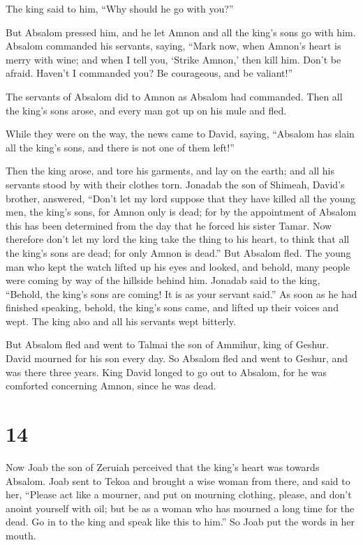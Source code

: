The king said to him, ``Why should he go with you?''

 But Absalom pressed him, and he let Amnon and all the
king's sons go with him.  Absalom commanded his servants,
saying, ``Mark now, when Amnon's heart is merry with wine; and when I
tell you, `Strike Amnon,' then kill him. Don't be afraid. Haven't I
commanded you? Be courageous, and be valiant!''

 The servants of Absalom did to Amnon as Absalom had
commanded. Then all the king's sons arose, and every man got up on his
mule and fled.

 While they were on the way, the news came to David,
saying, ``Absalom has slain all the king's sons, and there is not one of
them left!''

 Then the king arose, and tore his garments, and lay on the
earth; and all his servants stood by with their clothes torn.
 Jonadab the son of Shimeah, David's brother, answered,
``Don't let my lord suppose that they have killed all the young men, the
king's sons, for Amnon only is dead; for by the appointment of Absalom
this has been determined from the day that he forced his sister Tamar.
 Now therefore don't let my lord the king take the thing to
his heart, to think that all the king's sons are dead; for only Amnon is
dead.''  But Absalom fled. The young man who kept the watch
lifted up his eyes and looked, and behold, many people were coming by
way of the hillside behind him.  Jonadab said to the king,
``Behold, the king's sons are coming! It is as your servant said.''
 As soon as he had finished speaking, behold, the king's
sons came, and lifted up their voices and wept. The king also and all
his servants wept bitterly.

 But Absalom fled and went to Talmai the son of Ammihur,
king of Geshur. David mourned for his son every day.  So
Absalom fled and went to Geshur, and was there three years.
 King David longed to go out to Absalom, for he was
comforted concerning Amnon, since he was dead.

\hypertarget{section-13}{%
\section{14}\label{section-13}}

 Now Joab the son of Zeruiah perceived that the king's heart
was towards Absalom.  Joab sent to Tekoa and brought a wise
woman from there, and said to her, ``Please act like a mourner, and put
on mourning clothing, please, and don't anoint yourself with oil; but be
as a woman who has mourned a long time for the dead.  Go in
to the king and speak like this to him.'' So Joab put the words in her
mouth.

